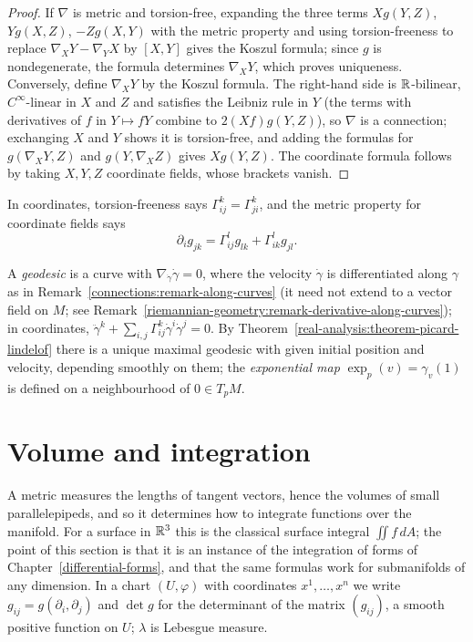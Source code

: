 \begin{proof}
If $\nabla$ is metric and torsion-free, expanding the three terms $Xg(Y, Z)$, $Yg(X, Z)$, $-Zg(X, Y)$ with the metric property and using torsion-freeness to replace $\nabla_XY - \nabla_YX$ by $[X, Y]$ gives the
Koszul formula; since $g$ is nondegenerate, the formula determines $\nabla_XY$, which proves uniqueness. Conversely, define $\nabla_XY$ by the Koszul formula. The right-hand side is $\mathbb{R}$-bilinear,
$C^\infty$-linear in $X$ and $Z$ and satisfies the Leibniz rule in $Y$ (the terms with derivatives of $f$ in $Y \mapsto fY$ combine to $2(Xf)g(Y, Z)$), so $\nabla$ is a connection; exchanging $X$ and $Y$ shows it
is torsion-free, and adding the formulas for $g(\nabla_XY, Z)$ and $g(Y, \nabla_XZ)$ gives $Xg(Y, Z)$. The coordinate formula follows by taking $X, Y, Z$ coordinate fields, whose brackets vanish.
\end{proof}

In coordinates, torsion-freeness says $\Gamma^k_{ij} = \Gamma^k_{ji}$, and the metric property for coordinate fields says
\begin{equation}\label{riemannian-geometry:equation-metric-christoffel}
\partial_ig_{jk} = \Gamma^l_{ij}g_{lk} + \Gamma^l_{ik}g_{jl}.
\end{equation}

\begin{definition}\label{riemannian-geometry:definition-geodesic}
A \emph{geodesic} is a curve with $\nabla_{\dot\gamma}\dot\gamma = 0$, where the velocity $\dot\gamma$ is differentiated along $\gamma$ as in
Remark~\ref{connections:remark-along-curves} (it need not extend to a vector field on $M$; see
Remark~\ref{riemannian-geometry:remark-derivative-along-curves}); in coordinates, $\ddot\gamma^k + \sum_{i,j}\Gamma^k_{ij}\dot\gamma^i\dot\gamma^j = 0$. By
Theorem~\ref{real-analysis:theorem-picard-lindelof} there is a unique maximal geodesic with given initial position and velocity, depending smoothly on them; the \emph{exponential map}
$\exp_p(v) = \gamma_v(1)$ is defined on a neighbourhood of $0 \in T_pM$.
\end{definition}

\section{Volume and integration}\label{riemannian-geometry:section-volume}

A metric measures the lengths of tangent vectors, hence the volumes of small parallelepipeds, and so it determines how to integrate functions over the manifold.
For a surface in $\mathbb{R}^3$ this is the classical surface integral $\iint f\,dA$; the point of this section is that it is an instance of the integration of forms of
Chapter~\ref{differential-forms}, and that the same formulas work for submanifolds of any dimension. In a chart $(U, \varphi)$ with coordinates $x^1, \ldots, x^n$ we write
$g_{ij} = g(\partial_i, \partial_j)$ and $\det g$ for the determinant of the matrix $(g_{ij})$, a smooth positive function on $U$; $\lambda$ is Lebesgue measure.

